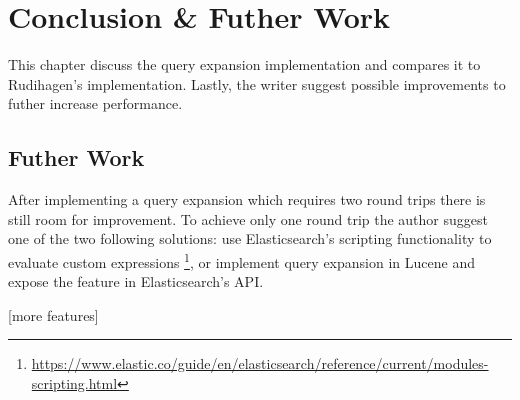 \chapter{Conclusion \& Futher Work}
\label{ch:conclusion}
This chapter discuss the query expansion implementation and compares it to Rudihagen's implementation.
Lastly, the writer suggest possible improvements to futher increase performance.

\section{Futher Work}
After implementing a query expansion which requires two round trips there is still room for improvement.
To achieve only one round trip the author suggest one of the two following solutions:
use Elasticsearch's scripting functionality to evaluate custom expressions \footnote{\url{https://www.elastic.co/guide/en/elasticsearch/reference/current/modules-scripting.html}},
or implement query expansion in Lucene and expose the feature in Elasticsearch's API.

[more features]
